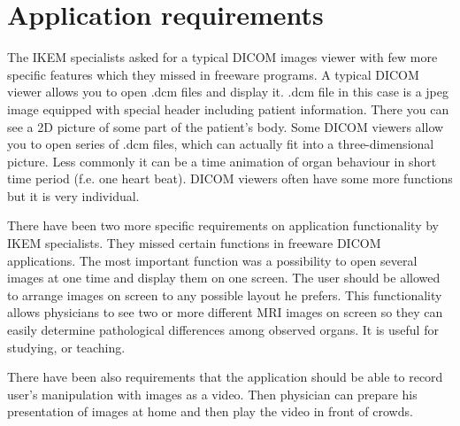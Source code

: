 \section*{Application requirements}
The IKEM specialists asked for a typical DICOM images viewer with few more specific features which they missed in freeware programs. A typical DICOM viewer allows you to open .dcm files and display it. .dcm file in this case is a jpeg image equipped with special header including patient information. There you can see a 2D picture of some part of the patient's body. Some DICOM viewers allow you to open series of .dcm files, which can actually fit into a three-dimensional picture. Less commonly it can be a time animation of organ behaviour in short time period (f.e. one heart beat). DICOM viewers often have some more functions but it is very individual.

There have been two more specific requirements on application functionality by IKEM specialists. They missed certain functions in freeware DICOM applications. The most important function was a possibility to open several images at one time and display them on one screen. The user should be allowed to arrange images on screen to any possible layout he prefers. This functionality allows physicians to see two or more different MRI images on screen so they can easily determine pathological differences among observed organs. It is useful for studying, or teaching.

There have been also requirements that the application should be able to record user's manipulation with images as a video. Then physician can prepare his presentation of images at home and then play the video in front of crowds.

